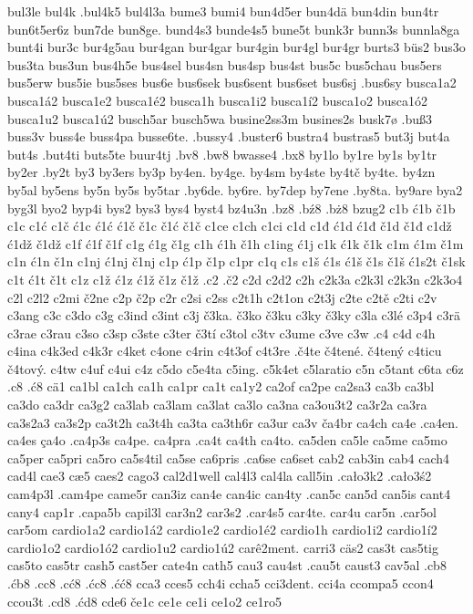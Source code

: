 bul3le
bul4k
.bul4k5
bul4l3a
bume3
bumi4
bun4d5er
bun4dä
bun4din
bun4tr
bun6t5er6z
bun7de
bun8ge.
bund4s3
bunde4s5
bune5t
bunk3r
bunn3s
bunnla8ga
bunt4i
bur3c
bur4g5au
bur4gan
bur4gar
bur4gin
bur4gl
bur4gr
burts3
büs2
bus3o
bus3ta
bus3un
bus4h5e
bus4sel
bus4sn
bus4sp
bus4st
bus5c
bus5chau
bus5ers
bus5erw
bus5ie
bus5ses
bus6e
bus6sek
bus6sent
bus6set
bus6sj
.bus6sy
busca1a2
busca1á2
busca1e2
busca1é2
busca1h
busca1i2
busca1í2
busca1o2
busca1ó2
busca1u2
busca1ú2
busch5ar
busch5wa
busine2ss3m
busines2s
busk7ø
.buß3
buss3v
buss4e
buss4pa
busse6te.
.bussy4
.buster6
bustra4
bustras5
but3j
but4a
but4s
.but4ti
buts5te
buur4tj
.bv8
.bw8
bwasse4
.bx8
by1lo
by1re
by1s
by1tr
by2er
.by2t
by3
by3ers
by3p
by4en.
by4ge.
by4sm
by4ste
by4tč
by4te.
by4zn
by5al
by5ens
by5n
by5s
by5tar
.by6de.
by6re.
by7dep
by7ene
.by8ta.
by9are
bya2
byg3l
byo2
byp4i
bys2
bys3
bys4
byst4
bz4u3n
.bz8
.bź8
.bż8
bzug2
c1b
ć1b
č1b
c1c
c1ć
c1č
ć1c
ć1ć
ć1č
č1c
č1ć
č1č
c1ce
c1ch
c1ci
c1d
c1đ
ć1d
ć1đ
č1d
č1đ
c1dž
ć1dž
č1dž
c1f
ć1f
č1f
c1g
ć1g
č1g
c1h
ć1h
č1h
c1ing
ć1j
c1k
ć1k
č1k
c1m
ć1m
č1m
c1n
ć1n
č1n
c1nj
ć1nj
č1nj
c1p
ć1p
č1p
c1pr
c1q
c1s
c1š
ć1s
ć1š
č1s
č1š
ć1s2t
č1sk
c1t
ć1t
č1t
c1z
c1ž
ć1z
ć1ž
č1z
č1ž
.c2
.č2
c2d
c2d2
c2h
c2k3a
c2k3l
c2k3n
c2k3o4
c2l
c2l2
c2mi
č2ne
c2p
č2p
c2r
c2si
c2ss
c2t1h
c2t1on
c2t3j
c2te
c2tě
c2ti
c2v
c3ang
c3c
c3do
c3g
c3ind
c3int
c3j
č3ka.
č3ko
č3ku
c3ky
č3ky
c3la
c3lé
c3p4
c3rä
c3rae
c3rau
c3so
c3sp
c3ste
c3ter
č3tí
c3tol
c3tv
c3ume
c3ve
c3w
.c4
c4d
c4h
c4ina
c4k3ed
c4k3r
c4ket
c4one
c4rin
c4t3of
c4t3re
.č4te
č4tené.
č4tený
c4ticu
č4tový.
c4tw
c4uf
c4ui
c4z
c5do
c5e4ta
c5ing.
c5k4et
c5laratio
c5n
c5tant
c6ta
c6z
.c8
.ć8
cä1
ca1bl
ca1ch
ca1h
ca1pr
ca1t
ca1y2
ca2of
ca2pe
ca2sa3
ca3b
ca3bl
ca3do
ca3dr
ca3g2
ca3lab
ca3lam
ca3lat
ca3lo
ca3na
ca3ou3t2
ca3r2a
ca3ra
ca3s2a3
ca3s2p
ca3t2h
ca3t4h
ca3ta
ca3th6r
ca3ur
ca3v
ča4br
ca4ch
ca4e
.ca4en.
ca4es
ça4o
.ca4p3s
ca4pe.
ca4pra
.ca4t
ca4th
ca4to.
ca5den
ca5le
ca5me
ca5mo
ca5per
ca5pri
ca5ro
ca5s4til
ca5se
ca6pris
.ca6se
ca6set
cab2
cab3in
cab4
cach4
cad4l
cae3
cæ5
caes2
cago3
cal2d1well
cal4l3
cal4la
call5in
.cało3k2
.cało3ś2
cam4p3l
.cam4pe
came5r
can3iz
can4e
can4ic
can4ty
.can5c
can5d
can5is
cant4
cany4
cap1r
.capa5b
capil3l
car3n2
car3s2
.car4s5
car4te.
car4u
car5n
.car5ol
car5om
cardio1a2
cardio1á2
cardio1e2
cardio1é2
cardio1h
cardio1i2
cardio1í2
cardio1o2
cardio1ó2
cardio1u2
cardio1ú2
carê2ment.
carri3
cäs2
cas3t
cas5tig
cas5to
cas5tr
cash5
cast5er
cate4n
cath5
cau3
cau4st
.cau5t
caust3
cav5al
.cb8
.ćb8
.cc8
.cć8
.ćc8
.ćć8
cca3
cces5
cch4i
ccha5
cci3dent.
cci4a
ccompa5
ccon4
ccou3t
.cd8
.ćd8
cde6
če1c
ce1e
ce1i
ce1o2
ce1ro5
